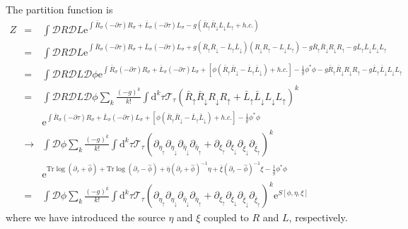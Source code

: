 \documentclass[12pt]{article}
\newcommand{\bea}{\begin{eqnarray}}
\newcommand{\eea}{\end{eqnarray}}
\newcommand{\md}{\mathrm{d}}
\newcommand{\me}{\mathrm{e}}
\begin{document}
The partition function is
\bea Z&=&\int{ \mathcal{D}R\mathcal{D}L \me^{\int{ \bar{R}_\sigma (-\partial\tau)R_\sigma + \bar{L}_\sigma (-\partial\tau)L_\sigma -g(\bar{R}_\uparrow \bar{R}_\downarrow L_\downarrow L_\uparrow + h.c.)} }} \\
&=&\int{ \mathcal{D}R\mathcal{D}L \me^{\int {\bar{R}_\sigma (-\partial\tau)R_\sigma + \bar{L}_\sigma (-\partial\tau)L_\sigma +g(\bar{R}_\uparrow \bar{R}_\downarrow-\bar{L}_\uparrow \bar{L}_\downarrow)(R_\downarrow R_\uparrow-L_\downarrow L_\uparrow) - g\bar{R}_\uparrow \bar{R}_\downarrow R_\downarrow R_\uparrow -g \bar{L}_\uparrow \bar{L}_\downarrow L_\downarrow L_\uparrow}}}  \\
&=&\int{ \mathcal{D}R\mathcal{D}L\mathcal{D}\phi \me^{ \int{  \bar{R}_\sigma (-\partial\tau)R_\sigma + \bar{L}_\sigma (-\partial\tau)L_\sigma +[\phi (\bar{R}_\uparrow \bar{R}_\downarrow-\bar{L}_\uparrow \bar{L}_\downarrow) + h.c.]-\frac1g\phi^*\phi  - g\bar{R}_\uparrow \bar{R}_\downarrow R_\downarrow R_\uparrow -g \bar{L}_\uparrow \bar{L}_\downarrow L_\downarrow L_\uparrow }}} \\
&=&\int \mathcal{D}R\mathcal{D}L\mathcal{D}\phi \sum_k \frac{(-g)^k}{k!} \int \md^k\tau \mathcal{T}_\tau (\bar{R}_\uparrow \bar{R}_\downarrow R_\downarrow R_\uparrow +\bar{L}_\uparrow \bar{L}_\downarrow L_\downarrow L_\uparrow)^k \nonumber\\ 
&&  \me^{ \int{  \bar{R}_\sigma (-\partial\tau)R_\sigma + \bar{L}_\sigma (-\partial\tau)L_\sigma +[\phi (\bar{R}_\uparrow \bar{R}_\downarrow-\bar{L}_\uparrow \bar{L}_\downarrow) + h.c.]-\frac1g\phi^*\phi  }} \\
&\rightarrow&\int \mathcal{D}\phi\sum_k\frac{(-g)^k}{k!}\int \md^k\tau\mathcal{T}_\tau(\partial_{\eta_\uparrow}\partial_{\eta_\downarrow}\partial_{\bar{\eta}_\downarrow}\partial_{\bar{\eta}_\uparrow}+\partial_{\xi_\uparrow}\partial_{\xi_\downarrow}\partial_{\bar{\xi}_\downarrow}\partial_{\bar{\xi}_\uparrow})^k \nonumber\\&& \me^{\mathrm{Tr}\log(\partial_\tau+\hat{\phi})+\mathrm{Tr}\log(\partial_\tau-\hat{\phi})+\bar{\eta}(\partial_\tau+\hat{\phi})^{-1}\eta+\bar{\xi}(\partial_\tau-\hat{\phi})^{-1}\xi-\frac1g\phi^*\phi} \\
&=& \int \mathcal{D}\phi \sum_k \frac{(-g)^k}{k!}\int \md^k\tau \mathcal{T}_\tau (\partial_{\eta_\uparrow}\partial_{\eta_\downarrow}\partial_{\bar{\eta}_\downarrow}\partial_{\bar{\eta}_\uparrow}+\partial_{\xi_\uparrow}\partial_{\xi_\downarrow}\partial_{\bar{\xi}_\downarrow}\partial_{\bar{\xi}_\uparrow})^k \me^{S[\phi,\eta,\xi]} \eea
where we have introduced the source $\eta$ and $\xi$ coupled to $R$ and $L$, respectively. 
\end{document}
